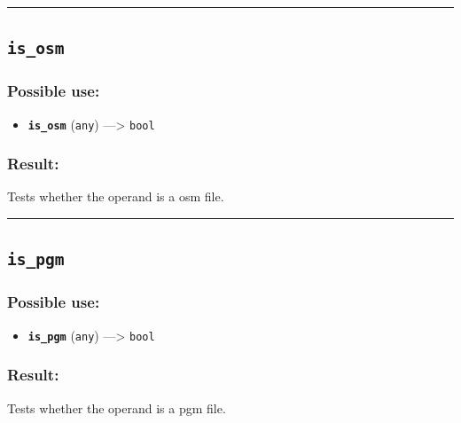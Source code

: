 \documentclass[]{book}
\providecommand{\tightlist}{%
  \setlength{\itemsep}{0pt}\setlength{\parskip}{0pt}}
\theoremstyle{definition}
\theoremstyle{definition}
\theoremstyle{definition}
\theoremstyle{remark}
\begin{document}
\begin{center}\rule{0.5\linewidth}{\linethickness}\end{center}

\subsection{\texorpdfstring{\texttt{is\_osm}}{is\_osm}}\label{is_osm}

\subsubsection{Possible use:}\label{possible-use-298}

\begin{itemize}
\tightlist
\item
  \textbf{\texttt{is\_osm}} (\texttt{any}) ---\textgreater{}
  \texttt{bool}
\end{itemize}

\subsubsection{Result:}\label{result-288}

Tests whether the operand is a osm file.

\begin{center}\rule{0.5\linewidth}{\linethickness}\end{center}

\subsection{\texorpdfstring{\texttt{is\_pgm}}{is\_pgm}}\label{is_pgm}

\subsubsection{Possible use:}\label{possible-use-299}

\begin{itemize}
\tightlist
\item
  \textbf{\texttt{is\_pgm}} (\texttt{any}) ---\textgreater{}
  \texttt{bool}
\end{itemize}

\subsubsection{Result:}\label{result-289}

Tests whether the operand is a pgm file.
\end{document}
